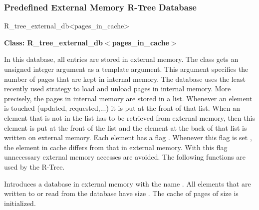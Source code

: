 \subsubsection{Predefined External Memory R-Tree Database}
\label{externalpre}
\begin{ccClassTemplate}{R_tree_external_db<pages_in_cache>}

\noindent
{\bf Class: R\_tree\_external\_db$<$pages\_in\_cache$>$}

\ccDefinition
In this database, all entries are stored in external memory. 
The class gets an unsigned integer argument  as a
template argument. This argument specifies the number of pages
that are kept in internal memory. The database uses the least
recently used strategy to load and unload pages in internal
memory. More precisely, the pages in internal memory are stored
in a list. Whenever an element is touched (updated,
requested,...) it is put at the front of that list. When an
element that is not in the list has to be retrieved from external 
memory, then this element is put at the front of the list and the 
element at the back of that list is written on external memory.
Each element has a flag . Whenever this flag is set
, the element in cache differs from that in external
memory. With this flag unnecessary external memory accesses are avoided.
The
following functions are used by the R-Tree.


\ccCreation

{Introduces a database in external memory with the name
  . All elements that are
  written to or read from the database have size
  . The cache of  pages of size 
   is initialized.}

\ccOperations
 






\end{ccClassTemplate}
